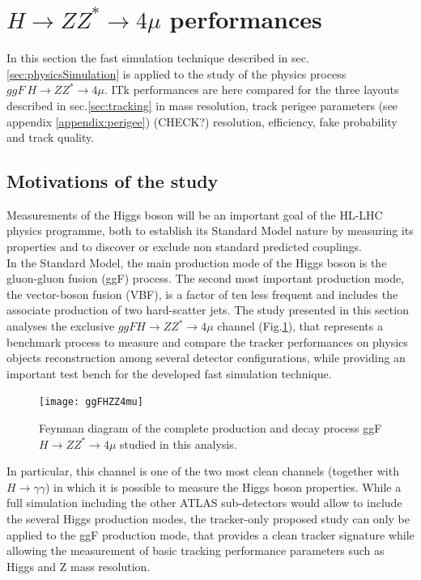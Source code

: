 \documentclass[a4paper,twoside,12pt]{article}
\begin{document}
\newpage

\section{$H \rightarrow ZZ^* \rightarrow 4\mu$ performances}
In this section the fast simulation technique described in sec.\ref{sec:physicsSimulation} is
applied to the study of the physics process $ggF\ H \rightarrow ZZ^* \rightarrow 4\mu$. ITk performances are here compared for the three layouts described in sec.\ref{sec:tracking} 
in mass resolution, track perigee parameters (see appendix \ref{appendix:perigee}) (CHECK?) resolution, efficiency, fake probability
and track quality.\\

\subsection{Motivations of the study}
Measurements of the Higgs boson will be an important goal of the HL-LHC physics programme, both to establish its Standard Model nature by measuring its properties and to 
discover or exclude non standard predicted couplings. \\

In the Standard Model, the main 
production mode of the Higgs boson is the gluon-gluon fusion (ggF) process. The second most 
important production mode, the vector-boson fusion (VBF), is a factor of ten less frequent and includes the associate
production of two hard-scatter jets. The study presented in this section analyses the exclusive
$ggF H \rightarrow ZZ^* \rightarrow 4\mu$ channel (Fig.\ref{fig:ggFHZZ4mu}), that represents a benchmark process to measure and compare the tracker performances on physics objects reconstruction among several detector
configurations, while providing an important test bench for the developed fast simulation technique.\\

\begin{figure} [h]
	\centering
	\texttt{[image: ggFHZZ4mu]}
	\caption{Feynman diagram of the complete production and decay process 
	ggF $H \rightarrow ZZ^* \rightarrow 4\mu$ studied in 
	this analysis.}
	\label{fig:ggFHZZ4mu}
\end{figure}

In particular, this channel is one of the two most clean channels (together with $H \rightarrow \gamma\gamma$) in which it is possible to measure the Higgs boson properties. While a full 
simulation including the other ATLAS sub-detectors would allow to include the several Higgs
production modes, the tracker-only proposed study can only
be applied to the ggF production mode, that provides a clean tracker signature while
allowing the measurement of basic tracking performance parameters such as Higgs and Z mass resolution.
\end{document}
